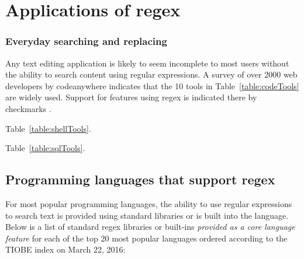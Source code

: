 \section{Applications of regex}

\subsubsection{Everyday searching and replacing}


Any text editing application is likely to seem incomplete to most users without the ability to search content using regular expressions.  A survey of over 2000 web developers by codeanywhere indicates that the 10 tools in Table~\ref{table:codeTools} are widely used.  Support for features using regex is indicated there by checkmarks .


 Table~\ref{table:shellTools}.


 Table~\ref{table:sqlTools}.



\subsection{Programming languages that support regex}

For most popular programming languages, the ability to use regular expressions to search text is provided using standard libraries or is built into the language.  Below is a list of standard regex libraries or built-ins \emph{provided as a core language feature} for each of the top 20 most popular languages ordered according to the TIOBE index on March 22, 2016:

